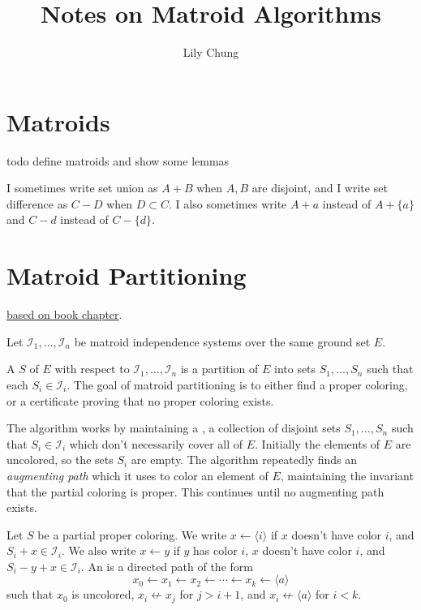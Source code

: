 \documentclass{article}
\title{Notes on Matroid Algorithms}
\author{Lily Chung}
\date{}
\newcommand*{\I}[0]{\mathcal{I}}
\newcommand*{\Cc}[0]{\mathcal{C}}
\begin{document}
\maketitle

\section*{Matroids}

todo define matroids and show some lemmas

I sometimes write set union as $A + B$ when $A, B$ are disjoint, and I write set difference as $C - D$ when $D \subset C$.
I also sometimes write $A + a$ instead of $A + \{a\}$ and $C - d$ instead of $C - \{d\}$.

\section*{Matroid Partitioning}

\href{https://page.math.tu-berlin.de/\~felsner/Lehre/SemMatS/Literatur/ScheinermanUllman:FractionalArboricity.pdf}{based on book chapter}.

Let $\I_1, \dots, \I_n$ be matroid independence systems over the same ground set $E$.

A  $S$ of $E$ with respect to $\I_1, \dots, \I_n$ is a partition of $E$ into sets $S_1, \dots, S_n$ such that each $S_i \in \I_i$.
The goal of matroid partitioning is to either find a proper coloring, or a certificate proving that no proper coloring exists.

The algorithm works by maintaining a ,
a collection of disjoint sets $S_1, \dots, S_n$ such that $S_i \in \I_i$ which don't necessarily cover all of $E$.
Initially the elements of $E$ are uncolored, so the sets $S_i$ are empty.
The algorithm repeatedly finds an \emph{augmenting path}
which it uses to color an element of $E$,
maintaining the invariant that the partial coloring is proper.
This continues until no augmenting path exists.

\begin{definition}
  Let $S$ be a partial proper coloring.
  We write $x \gets \langle i \rangle$ if $x$ doesn't have color $i$, and $S_i + x \in \I_i$.
  We also write $x \gets y$ if $y$ has color $i$, $x$ doesn't have color $i$, and $S_i - y + x \in \I_i$.
  An  is a directed path of the form
  \[x_0 \gets x_1 \gets x_2 \gets \cdots \gets x_k \gets \langle a \rangle\]
  such that $x_0$ is uncolored, $x_i \not\gets x_j$ for $j > i + 1$, and $x_i \not\gets \langle a \rangle$ for $i < k$.
\end{definition}
\end{document}
